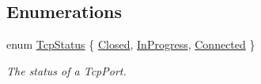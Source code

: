 \subsection*{Enumerations}
\begin{DoxyCompactItemize}
\item 
enum \hyperlink{group__tcp_gad2e85a3151cfb7e79fcba1dc40813da1}{Tcp\+Status} \{ \newline
\hyperlink{group__tcp_ggad2e85a3151cfb7e79fcba1dc40813da1a30c0b4dad1e3a3b93f822b9cef26244b}{Closed}, 
\newline
\hyperlink{group__tcp_ggad2e85a3151cfb7e79fcba1dc40813da1a37598fb32f748e1b192f3febe773379f}{In\+Progress}, 
\newline
\hyperlink{group__tcp_ggad2e85a3151cfb7e79fcba1dc40813da1ad253364cc2926eb617b0833335fe4467}{Connected}
 \}\begin{DoxyCompactList}\small\item\em The status of a Tcp\+Port. \end{DoxyCompactList}
\end{DoxyCompactItemize}
